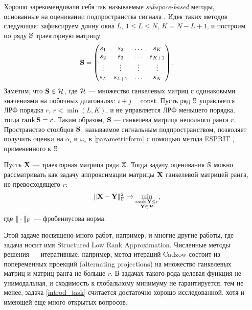 \documentclass[12pt, specialist, subf,href,colorlinks=true,substylefile = spbu.rtx]{disser}
\def\rank{\mathop{\mathrm{rank}}}
\theoremstyle{remark}
\theoremstyle{definition}
\begin{document}
Хорошо зарекомендовали себя так называемые \emph{subspace-based} методы, основанные на оценивании подпространства сигнала \cite{Broomhead.King1986, Vautard.etal1992, Elsner.Tsonis1996, Golyandina.etal2001}.
Идея таких методов следующая: зафиксируем длину окна $L$, $1 \le L \le N$, $K = N - L + 1$, и построим по ряду $\mathbb{S}$ траекторную матрицу
\begin{equation*}
\mathbf{S} = \begin{pmatrix}
s_1 & s_2 & \ldots & s_K \\
s_2 & s_3 & \ldots & s_{K + 1} \\
\vdots & \vdots & \vdots & \vdots \\
s_L & s_{L + 1} & \ldots & s_N
\end{pmatrix}.
\end{equation*}
Заметим, что $\mathbf{S}\in \mathcal{H}$, где $\mathcal{H}$ --- множество ганкелевых матриц с одинаковыми значениями на побочных диагоналях: $i+j=\mathrm{const}$.
Пусть ряд $\mathbb{S}$ управляется ЛРФ порядка $r$, $r < \min(L, K)$, и не управляется ЛРФ меньшего порядка, тогда $\rank \bfS = r$. Таким образом, $\mathbf{S}$ --- ганкелева матрица неполного ранга $r$. Пространство столбцов $\mathbf{S}$, называемое сигнальным подпространством, позволяет получить оценки на $\alpha_i$ и $\omega_i$ в \eqref{parametricform} с помощью метода ESPRIT \cite{Roy.Kailath1989, Golyandina.Zhigljavsky2012}, примененного к $\mathbb{S}$.

Пусть $\mathbf{X}$ --- траекторная матрица ряда $\mathbb{X}$. Тогда задачу оценивания $\mathbb{S}$ можно рассматривать как задачу аппроксимации матрицы $\mathbf{X}$ ганкелевой матрицей ранга, не превосходящего $r$:
\begin{equation}\label{introd_task}
\|\bfX - \bfY\|^2_\rmF \to \min_{\substack{\rank \bfY \le r \\ \bfY \in \calH}},
\end{equation}
где $\|\cdot\|_{\mathrm{F}}$ --- фробениусова норма.

Этой задаче посвящено много работ, например, \cite{Cadzow1988, Markovsky2011, Usevich.Markovsky2014, Gillard.Zhigljavsky2013} и многие другие работы, где задача носит имя
Structured Low Rank Approximation. Численные методы решения --- итеративные, например, метод итераций Cadzow \cite{Cadzow1988} состоит из попеременных проекций (alternating projections) на множество ганкелевых матриц и матриц ранга не больше $r$. В задачах такого рода целевая функция не унимодальная, и сходимость к глобальному минимуму не гарантируется; тем не менее, задача \eqref{introd_task} считается достаточно хорошо исследованной, хотя и имеющей еще много открытых вопросов.
\end{document}
